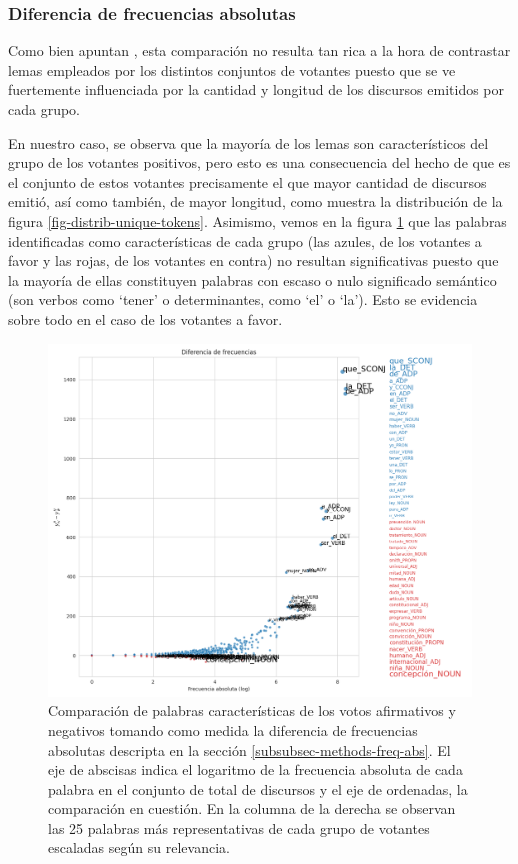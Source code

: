 \subsubsection{Diferencia de frecuencias absolutas}
Como bien apuntan \cite{monroe2008fightin}, esta comparaci\'on no resulta tan rica
a la hora de contrastar lemas empleados por los distintos conjuntos de
votantes puesto que se ve fuertemente influenciada por la cantidad y longitud
de los discursos emitidos por cada grupo.
\par
En nuestro caso, se observa que la mayor\'ia de los lemas son caracter\'isticos
del grupo de los votantes positivos, pero esto es una consecuencia del hecho
de que es el conjunto de estos votantes precisamente el que mayor cantidad de
discursos emiti\'o, as\'i como tambi\'en, de mayor longitud, como muestra la distribuci\'on
de la figura \ref{fig-distrib-unique-tokens}. Asimismo, vemos en la figura
\ref{fig-statistics-freq-abs} que las palabras identificadas como caracter\'isticas
de cada grupo (las azules, de los votantes a favor y las rojas, de los votantes
en contra) no resultan significativas puesto que la mayor\'ia de ellas constituyen
palabras con escaso o nulo significado sem\'antico (son verbos como `tener' o
determinantes, como `el' o `la'). Esto se evidencia sobre todo en el caso de
los votantes a favor.

\begin{figure}[h!]
    \centering
    \includegraphics[scale=0.4]{./images/graphs/frecuencias.png}
    \caption{Comparaci\'on de palabras caracter\'isticas de los votos afirmativos y
    negativos tomando como medida la diferencia de frecuencias absolutas descripta
    en la secci\'on \ref{subsubsec-methods-freq-abs}. El eje de abscisas indica el
    logaritmo de la frecuencia absoluta de cada palabra en el conjunto de total
    de discursos y el eje de ordenadas, la comparaci\'on en cuesti\'on. En la
    columna de la derecha se observan las 25 palabras m\'as representativas de
    cada grupo de votantes escaladas seg\'un su relevancia.}
    \label{fig-statistics-freq-abs}
\end{figure}

